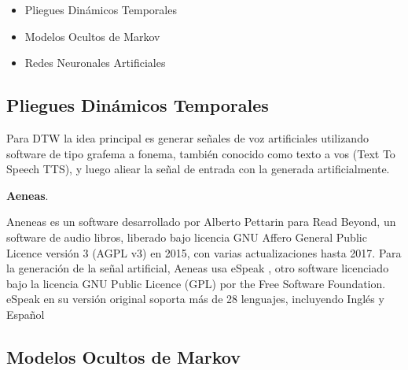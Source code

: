 \begin{itemize}
    \item Pliegues Dinámicos Temporales
    \item Modelos Ocultos de Markov
    \item Redes Neuronales Artificiales
\end{itemize}

\subsection{Pliegues Dinámicos Temporales}

Para DTW la idea principal es generar señales de voz artificiales utilizando software de tipo grafema a fonema, también conocido como texto a vos (Text To Speech TTS), y luego aliear la señal de entrada con la generada artificialmente.


\textbf{Aeneas}.

Aneneas \cite{aeneas} es un software desarrollado por Alberto Pettarin para Read Beyond, un software de audio libros, liberado bajo licencia GNU Affero General Public Licence versión 3 (AGPL v3) en 2015, con varias actualizaciones hasta 2017. Para la generación de la señal artificial, Aeneas usa eSpeak \cite{espeak}, otro software licenciado bajo la licencia GNU Public Licence (GPL) por the Free Software Foundation. eSpeak en su versión original soporta más de 28 lenguajes, incluyendo Inglés y Español

\subsection{Modelos Ocultos de Markov}

